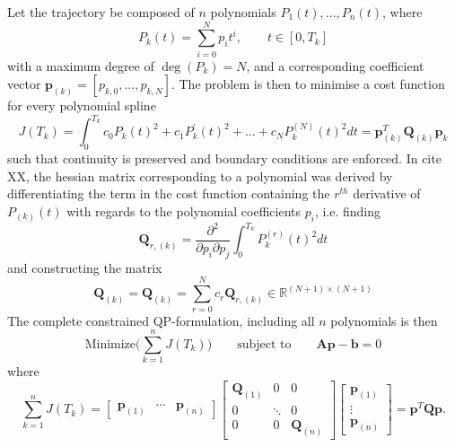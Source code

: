 \documentclass{article}
\begin{document}
Let the trajectory be composed of $n$ polynomials $P_{1}(t),...,P_{n}(t)$, where
\begin{equation}
P_{k}(t) = \sum\limits_{i = 0}^N p_it^i, \qquad t\in[0,T_k]
\end{equation}
with a maximum degree of $\deg(P_{k})=N$, and a corresponding coefficient vector $\mathbf{p}_{(k)}=[p_{k,0},...,p_{k,N}]$. The problem is then to minimise a cost function for every polynomial spline
\begin{equation}
J(T_k) = \int_0^{T_k} c_0P_{k}(t)^2 +  c_1P^{\prime}_k(t)^2  + ... + c_NP^{(N)}_{k}(t)^2 dt = \mathbf{p}_{(k)}^T\mathbf{Q}_{(k)}\mathbf{p}_k
\end{equation}
such that continuity is preserved and boundary conditions are enforced. In cite XX, the hessian matrix corresponding to a polynomial was derived by differentiating the term in the cost function containing the $r^{th}$ derivative of $P_{(k)}(t)$ with regards to the polynomial coefficients $p_i$, i.e. finding
\begin{equation}
\mathbf{Q}_{r,(k)}= \frac{\partial^2}{\partial p_i\partial p_j} \int_0^{T_k} P_{k}^{(r)}(t)^2dt
\end{equation}
and constructing the matrix
\begin{equation}
\mathbf{Q}_{(k)}=\mathbf{Q}_{(k)} = \sum\limits_{r = 0}^N c_r\mathbf{Q}_{r,(k)}\in \mathbb{R}^{(N+1)\times (N+1)}
\end{equation}
The complete constrained QP-formulation, including all $n$ polynomials is then
\begin{equation}
\text{Minimize}\Big(\sum_{k=1}^nJ(T_k)\Big)\qquad\text{subject to}\qquad\mathbf{A}\mathbf{p}-\mathbf{b}=0
\end{equation}
where
\begin{equation}
\end{equation}
\begin{equation}
\sum_{k=1}^nJ(T_k) =
\begin{bmatrix}
\mathbf{p}_{(1)} & \cdots & \mathbf{p}_{(n)}
\end{bmatrix}
\begin{bmatrix}
\mathbf{Q}_{(1)} & 0 & 0 \\
0 & \ddots & 0 \\
0 & 0 & \mathbf{Q}_{(n)}
\end{bmatrix}
\begin{bmatrix}
\mathbf{p}_{(1)} \\ \vdots \\ \mathbf{p}_{(n)}
\end{bmatrix}
 = \mathbf{p}^T\mathbf{Q}\mathbf{p}.
\end{equation}
\end{document}
